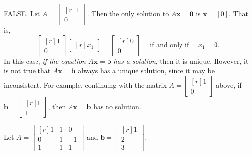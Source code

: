 \documentclass[answers,addpoints,12pt]{exam}
\theoremstyle{remark}
\renewcommand{\vec}[1]{\mathbf{#1}}
\newcommand{\<}{\ensuremath{\langle}}
\renewcommand{\>}{\ensuremath{\rangle}}
\newcommand\vb{\vec{b}}
\newcommand\vx{\vec{x}}
\newcommand\vzero{\vec{0}}
\begin{document}
\begin{questions}
\begin{parts}
      \begin{solution}
        FALSE. 
        Let $A = \begin{bmatrix*}[r] 1\\0 \end{bmatrix*}$.
        Then the only solution to $A\vx =\vzero$ is $\vx =[0]$. That is,
        \[\begin{bmatrix*}[r] 1\\0 \end{bmatrix*} 
        \begin{bmatrix*}[r] x_1 \end{bmatrix*} 
        =\begin{bmatrix*}[r] 0\\0 \end{bmatrix*}
        \quad \text{ if and only if } \quad x_1 = 0.\]
        In this case, \emph{if the equation $A\vx = \vb$ has a solution}, then it is unique.
        However, it is not true that $A\vx = \vb$ always has a unique solution,
        since it may be inconsistent.
        For example, continuing with the matrix $A = \begin{bmatrix*}[r] 1\\0 \end{bmatrix*}$ above, 
        if $\vb = \begin{bmatrix*}[r] 1\\1\end{bmatrix*}$, then $A\vx = \vb$ has no solution.
      \end{solution}

 
     \end{parts}

  \newpage

  \question  Let 
  $A = \begin{bmatrix*}[r] 1 & 1 & 0\\ 0 & 1& -1\\ 1 & 1 & 1\end{bmatrix*}$
    and $\vb = \begin{bmatrix*}[r] 1\\2\\3\end{bmatrix*}$.
\end{questions}
\end{document}
